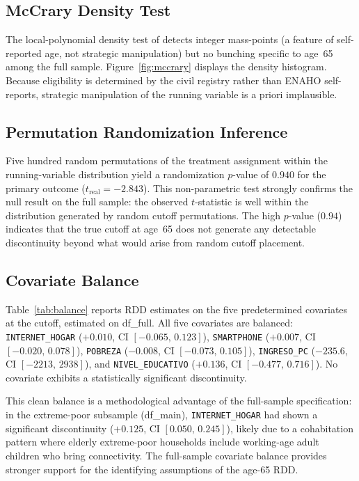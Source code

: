 \documentclass[12pt]{article}
\begin{document}
\subsection{McCrary Density Test}

The local-polynomial density test of \citet{cattaneo2018} detects integer
mass-points (a feature of self-reported age, not strategic manipulation)
but no bunching specific to age~65 among the full sample.
Figure~\ref{fig:mccrary} displays the density histogram. Because
eligibility is determined by the civil registry rather than ENAHO
self-reports, strategic manipulation of the running variable is a priori
implausible.

\subsection{Permutation Randomization Inference}

Five hundred random permutations of the treatment assignment within the
running-variable distribution yield a randomization $p$-value of $0.940$
for the primary outcome ($t_{\text{real}}=-2.843$). This non-parametric
test strongly confirms the null result on the full sample: the observed
$t$-statistic is well within the distribution generated by random cutoff
permutations. The high $p$-value ($0.94$) indicates that the true cutoff
at age~65 does not generate any detectable discontinuity beyond what would
arise from random cutoff placement.

\subsection{Covariate Balance}
\label{subsec:balance}

Table~\ref{tab:balance} reports RDD estimates on the five predetermined
covariates at the cutoff, estimated on df\_full. All five covariates are
balanced: \texttt{INTERNET\_HOGAR} ($+0.010$, CI $[-0.065,\,0.123]$),
\texttt{SMARTPHONE} ($+0.007$, CI $[-0.020,\,0.078]$),
\texttt{POBREZA} ($-0.008$, CI $[-0.073,\,0.105]$),
\texttt{INGRESO\_PC} ($-235.6$, CI $[-2213,\,2938]$), and
\texttt{NIVEL\_EDUCATIVO} ($+0.136$, CI $[-0.477,\,0.716]$). No covariate
exhibits a statistically significant discontinuity.

This clean balance is a methodological advantage of the full-sample
specification: in the extreme-poor subsample (df\_main), \texttt{INTERNET\_HOGAR}
had shown a significant discontinuity ($+0.125$, CI $[0.050,\,0.245]$),
likely due to a cohabitation pattern where elderly extreme-poor households
include working-age adult children who bring connectivity. The full-sample
covariate balance provides stronger support for the identifying assumptions
of the age-65 RDD.
\end{document}
